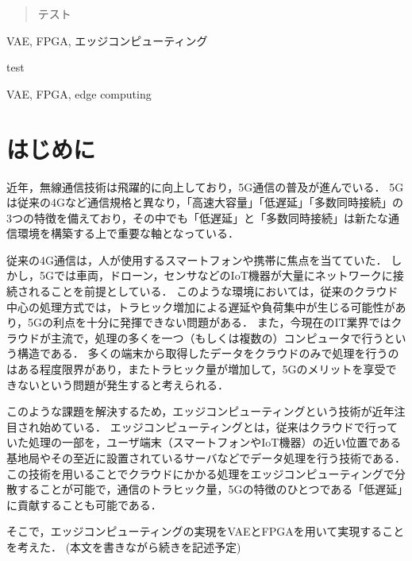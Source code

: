 \documentclass[paper]{ieicej}
\begin{document}
\begin{abstract}
テスト

\end{abstract}
\begin{keyword}
VAE, FPGA, エッジコンピューティング
\end{keyword}
\begin{eabstract}
test
\end{eabstract}
\begin{ekeyword}
VAE, FPGA, edge computing
\end{ekeyword}
\maketitle

\section{はじめに}
近年，無線通信技術は飛躍的に向上しており，5G通信の普及が進んでいる．
5Gは従来の4Gなど通信規格と異なり，「高速大容量」「低遅延」「多数同時接続」の3つの特徴を備えており，その中でも「低遅延」と「多数同時接続」は新たな通信環境を構築する上で重要な軸となっている\cite{5g}．

従来の4G通信は，人が使用するスマートフォンや携帯に焦点を当てていた．
しかし，5Gでは車両，ドローン，センサなどのIoT機器が大量にネットワークに接続されることを前提としている．
このような環境においては，従来のクラウド中心の処理方式では，トラヒック増加による遅延や負荷集中が生じる可能性があり，5Gの利点を十分に発揮できない問題がある．
また，今現在のIT業界ではクラウドが主流で，処理の多くを一つ（もしくは複数の）コンピュータで行うという構造である．
多くの端末から取得したデータをクラウドのみで処理を行うのはある程度限界があり，またトラヒック量が増加して，5Gのメリットを享受できないという問題が発生すると考えられる．

このような課題を解決するため，エッジコンピューティングという技術が近年注目され始めている．
エッジコンピューティングとは，従来はクラウドで行っていた処理の一部を，ユーザ端末（スマートフォンやIoT機器）の近い位置である基地局やその至近に設置されているサーバなどでデータ処理を行う技術である\cite{edge-com}．
この技術を用いることでクラウドにかかる処理をエッジコンピューティングで分散することが可能で，通信のトラヒック量，5Gの特徴のひとつである「低遅延」に貢献することも可能である．

そこで，エッジコンピューティングの実現をVAEとFPGAを用いて実現することを考えた．
(本文を書きながら続きを記述予定)
\end{document}
